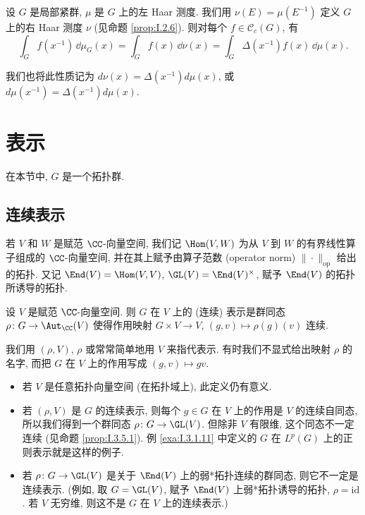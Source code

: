 \begin{proposition}[$f(x^{-1})$ 的积分公式]
\label{prop:I.2.12}
设 $G$ 是局部紧群, $\mu$ 是 $G$ 上的左 Haar 测度. 我们用 $\nu(E) = \mu(E^{-1})$ 定义 $G$ 上的右 Haar 测度 $\nu$ (见命题 \ref{prop:I.2.6}).
则对每个 $f \in \mathcal{C}_c(G)$, 有
\[
\int_G f(x^{-1}) \,\dd\mu_G(x) = \int_G f(x) \,\dd\nu(x) = \int_G \Delta(x^{-1})f(x) \,\dd\mu(x).
\]
\end{proposition}

我们也将此性质记为 $d\nu(x) = \Delta(x^{-1})d\mu(x)$, 或 $d\mu(x^{-1}) = \Delta(x^{-1})d\mu(x)$.

\section{表示}
在本节中, $G$ 是一个拓扑群.

\subsection{连续表示}

\begin{definition}
\label{def:I.3.1.1}
若 $V$ 和 $W$ 是赋范 $\CC$-向量空间, 我们记 $\Hom(V, W)$ 为从 $V$ 到 $W$ 的有界线性算子组成的 $\CC$-向量空间, 并在其上赋予由算子范数 (operator norm) $\|\cdot\|_{\mathrm{op}}$ 给出的拓扑. 又记 $\End(V) = \Hom(V, V)$, $\GL(V) = \End(V)^{\times}$, 赋予 $\End(V)$ 的拓扑所诱导的拓扑.
\end{definition}

\begin{definition}
\label{def:I.3.1.2}
设 $V$ 是赋范 $\CC$-向量空间. 则 $G$ 在 $V$ 上的 (连续) 表示是群同态 $\rho \colon G \to \Aut_{\CC}(V)$ 使得作用映射 $G \times V \to V$, $(g, v) \longmapsto \rho(g)(v)$ 连续.
\end{definition}

我们用 $(\rho, V)$, $\rho$ 或常常简单地用 $V$ 来指代表示. 有时我们不显式给出映射 $\rho$ 的名字, 而把 $G$ 在 $V$ 上的作用写成 $(g, v) \longmapsto gv$.

\begin{remark}[定义的一般性]
\label{rem:I.3.1.3}
\begin{itemize}
\item 若 $V$ 是任意拓扑向量空间 (在拓扑域上), 此定义仍有意义.
\item 若 $(\rho, V)$ 是 $G$ 的连续表示, 则每个 $g \in G$ 在 $V$ 上的作用是 $V$ 的连续自同态, 所以我们得到一个群同态 $\rho \colon G \to \GL(V)$. 但除非 $V$ 有限维, 这个同态不一定连续 (见命题 \ref{prop:I.3.5.1}). 例 \ref{exa:I.3.1.11} 中定义的 $G$ 在 $L^p(G)$ 上的正则表示就是这样的例子.
\item 若 $\rho \colon G \to \GL(V)$ 是关于 $\End(V)$ 上的弱*拓扑连续的群同态, 则它不一定是连续表示. (例如, 取 $G = \GL(V)$, 赋予 $\End(V)$ 上弱*拓扑诱导的拓扑, $\rho = \mathrm{id}$. 若 $V$ 无穷维, 则这不是 $G$ 在 $V$ 上的连续表示.)
\end{itemize}
\end{remark}

